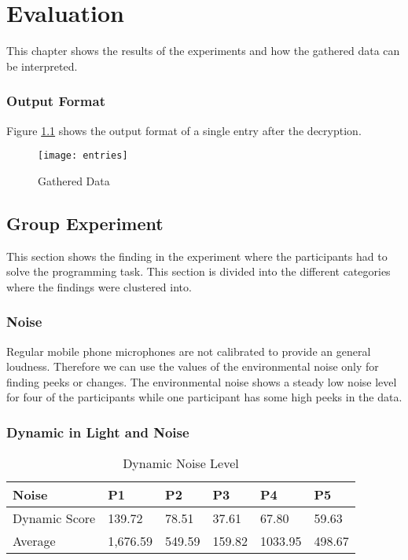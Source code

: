 \chapter{Evaluation}
This chapter shows the results of the experiments and how the gathered data can be interpreted. 

\subsection{Output Format}
Figure \ref{entries} shows the output format of a single entry after the decryption. 

\begin{figure}[!htb]
\centering
\texttt{[image: entries]}
\caption{Gathered Data}\label{entries}
\vspace{10 mm}
\end{figure}

\FloatBarrier

\section{Group Experiment}
This section shows the finding in the experiment where the participants had to solve the programming task. This section is divided into the different categories where the findings were clustered into. 

\subsection{Noise}
Regular mobile phone microphones are not calibrated to provide an general loudness. Therefore we can use the values of the environmental noise only for finding peeks or changes.
The environmental noise shows a steady low noise level for four of the participants while one participant has some high peeks in the data. 

\subsection{Dynamic in Light and Noise}
\FloatBarrier

\begin{table}[ht]
  \begin{tabular}{|P{3cm}|P{1.6cm}|P{1.6cm}|P{1.6cm}|P{1.6cm}|P{1.6cm}|}
   	\textbf{Noise}				& \textbf{P1}			& \textbf{P2}			& 	\textbf{P3}		& 	\textbf{P4}			& 	\textbf{P5}	\\ \hline
  	Dynamic Score				& 139.72					& 78.51					& 37.61				& 67.80					& 59.63			\\ \hline
  	Average 						& 1,676.59				& 549.59					& 159.82				& 1033.95				& 498.67			\\ \hline
  	\end{tabular}
  	\newline\newline
  	\caption{Dynamic Noise Level}\label{dynNoise}
\end{table}

